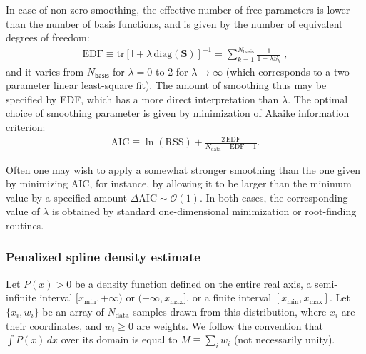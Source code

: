 \documentclass[12pt]{article}
\begin{document}
In case of non-zero smoothing, the effective number of free parameters is lower than the number of basis functions, and is given by the number of equivalent degrees of freedom:
\begin{align}
\mathrm{EDF} \equiv \mathrm{tr}[\mathsf{I} + \lambda\,\mathrm{diag}(\boldsymbol{S})]^{-1} =
\sum_{k=1}^{N_\mathrm{basis}} \frac{1}{1+\lambda S_k} \;,
\end{align}
and it varies from $N_\mathsf{basis}$ for $\lambda=0$ to 2 for $\lambda\to\infty$ (which corresponds to a two-parameter linear least-square fit). The amount of smoothing thus may be specified by EDF, which has a more direct interpretation than $\lambda$. The optimal choice of smoothing parameter is given by minimization of Akaike information criterion:
\begin{align}
\mathrm{AIC} \equiv \ln(\mathrm{RSS}) + \frac{2\,\mathrm{EDF}}{N_\mathrm{data}-\mathrm{EDF}-1}.
\end{align}

Often one may wish to apply a somewhat stronger smoothing than the one given by minimizing AIC, for instance, by allowing it to be larger than the minimum value by a specified amount $\Delta\mathrm{AIC}\sim \mathcal{O}(1)$. In both cases, the corresponding value of $\lambda$ is  obtained by standard one-dimensional minimization or root-finding routines.

\subsubsection{Penalized spline density estimate}  \label{sec:MathSplineDensityDetails}

Let $P(x)>0$ be a density function defined on the entire real axis, a semi-infinite interval $[x_\mathrm{min},+\infty)$ or $(-\infty,x_\mathrm{max}]$, or a finite interval $[x_\mathrm{min},x_\mathrm{max}]$.
Let $\{x_i, w_i\}$ be an array of $N_\mathrm{data}$ samples drawn from this distribution, where $x_i$ are their coordinates, and $w_i\ge 0$ are weights. We follow the convention that $\int P(x)\,dx$ over its domain is equal to $M\equiv \sum_i w_i$ (not necessarily unity).
\end{document}
